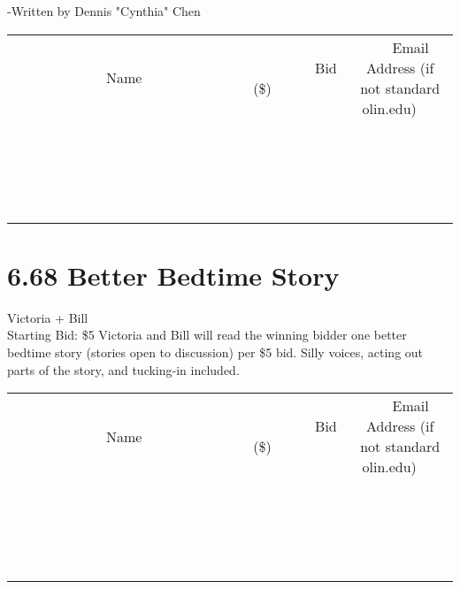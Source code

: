\documentclass[11pt]{article}
\begin{document}
-Written by Dennis "Cynthia" Chen
\\[3ex]
\begin{tabular}{c c c}
~~~~~~~~~~~~~Name~~~~~~~~~~~~~ & ~~~~~~~~~Bid (\$)~~~~~~~~~  & ~~~Email Address (if not standard olin.edu)~~~\\
 & & \\
\hline
 & & \\
\hline
 & & \\
\hline
 & & \\
\hline
 & & \\
\hline
 & & \\
\hline
 & & \\
\hline
 & & \\
\hline
 & & \\
\hline
 & & \\
\hline
 & & \\
\hline
 & & \\
\hline
 & & \\
\hline
 & & \\
\hline
 & & \\
\hline
 & & \\
\hline
 & & \\
\hline
 & & \\
\hline
 & & \\
\hline
\end{tabular}
\newpage
\section*{6.68 Better Bedtime Story}
Victoria + Bill
\\
Starting Bid: \$5
\newline
Victoria and Bill will read the winning bidder one better bedtime story (stories open to discussion) per \$5 bid. Silly voices, acting out parts of the story, and tucking-in included.
\\[3ex]
\begin{tabular}{c c c}
~~~~~~~~~~~~~Name~~~~~~~~~~~~~ & ~~~~~~~~~Bid (\$)~~~~~~~~~  & ~~~Email Address (if not standard olin.edu)~~~\\
 & & \\
\hline
 & & \\
\hline
 & & \\
\hline
 & & \\
\hline
 & & \\
\hline
 & & \\
\hline
 & & \\
\hline
 & & \\
\hline
 & & \\
\hline
 & & \\
\hline
 & & \\
\hline
 & & \\
\hline
 & & \\
\hline
 & & \\
\hline
 & & \\
\hline
 & & \\
\hline
 & & \\
\hline
 & & \\
\hline
 & & \\
\hline
\end{tabular}
\newpage
\end{document}
